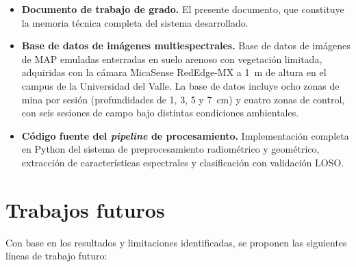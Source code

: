 \begin{itemize}
  \item \textbf{Documento de trabajo de grado.} El presente documento,
    que constituye la memoria técnica completa del sistema desarrollado.

  \item \textbf{Base de datos de imágenes multiespectrales.} Base de datos de
    imágenes de \ac{MAP} emuladas enterradas en suelo arenoso con vegetación
    limitada, adquiridas con la cámara MicaSense RedEdge-MX
    a \SI{1}{m} de altura en el campus de la Universidad del Valle.
    La base de datos incluye ocho zonas de mina por sesión (profundidades de
    1, 3, 5 y 7~cm) y cuatro zonas de control, con seis sesiones de
    campo bajo distintas condiciones ambientales.

  \item \textbf{Código fuente del \textit{pipeline} de procesamiento.}
    Implementación completa en Python del sistema de preprocesamiento
    radiométrico y geométrico, extracción de características espectrales
    y clasificación con validación \ac{LOSO}. 
\end{itemize}

\section{Trabajos futuros}
\label{sec:trabajos_futuros}

Con base en los resultados y limitaciones identificadas, se proponen las
siguientes líneas de trabajo futuro:

